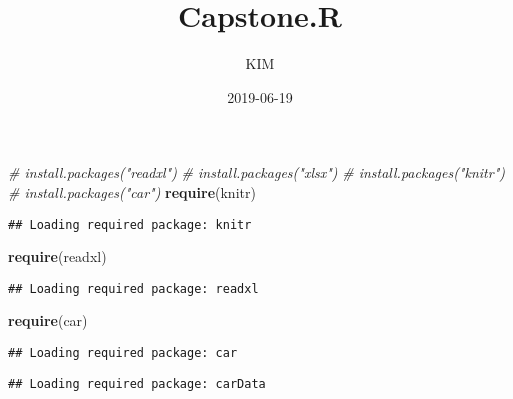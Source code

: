 \documentclass[]{article}
\title{Capstone.R}
\author{KIM}
\date{2019-06-19}
\newenvironment{Shaded}{\begin{snugshade}}{\end{snugshade}}
\newcommand{\CommentTok}[1]{\textcolor[rgb]{0.56,0.35,0.01}{\textit{#1}}}
\newcommand{\KeywordTok}[1]{\textcolor[rgb]{0.13,0.29,0.53}{\textbf{#1}}}
\newcommand{\NormalTok}[1]{#1}
\begin{document}
\maketitle

\begin{Shaded}
\begin{Highlighting}[]
\CommentTok{# install.packages("readxl")}
\CommentTok{# install.packages("xlsx")}
\CommentTok{# install.packages("knitr")}
\CommentTok{# install.packages("car")}
\KeywordTok{require}\NormalTok{(knitr)}
\end{Highlighting}
\end{Shaded}

\begin{verbatim}
## Loading required package: knitr
\end{verbatim}

\begin{Shaded}
\begin{Highlighting}[]
\KeywordTok{require}\NormalTok{(readxl)}
\end{Highlighting}
\end{Shaded}

\begin{verbatim}
## Loading required package: readxl
\end{verbatim}

\begin{Shaded}
\begin{Highlighting}[]
\KeywordTok{require}\NormalTok{(car)}
\end{Highlighting}
\end{Shaded}

\begin{verbatim}
## Loading required package: car
\end{verbatim}

\begin{verbatim}
## Loading required package: carData
\end{verbatim}
\end{document}
